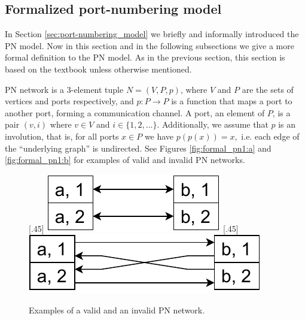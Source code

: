 \subsection{Formalized port-numbering model} \label{sec:formalized_pn_model}
In Section \ref{sec:port-numbering_model} we briefly and informally introduced the PN model.
Now in this section and in the following subsections we give a more formal definition to the PN model.
As in the previous section, this section is based on the textbook \cite{HirvonenSuomelaDistAlg2020} unless otherwise mentioned.

PN network is a 3-element tuple $N = (V, P, p)$, where $V$ and $P$ are the sets of vertices and ports respectively, and $p\colon P \rightarrow P$ is a function that maps a port to another port, forming a communication channel.
A port, an element of $P$, is a pair $(v, i)$ where $v \in V$ and $i \in \{1, 2, \dotsc\}$.
Additionally, we assume that $p$ is an involution, that is, for all ports $x \in P$ we have $p(p(x)) = x, $ i.e. each edge of the ``underlying graph'' is undirected.
See Figures \ref{fig:formal_pn1:a} and \ref{fig:formal_pn1:b} for examples of valid and invalid PN networks.

\begin{figure}[H]
    [.45\linewidth] {
    \centering
    \includegraphics[scale=0.6]{diagrams/formalizing_pn_network_diagram1.pdf}
  }
  \hfill
    [.45\linewidth] {
    \centering
    \includegraphics[scale=0.6]{diagrams/formalizing_pn_network_diagram2.pdf}
  }
  \caption{Examples of a valid and an invalid PN network.}
  \label{fig:formal_pn1}
\end{figure}


